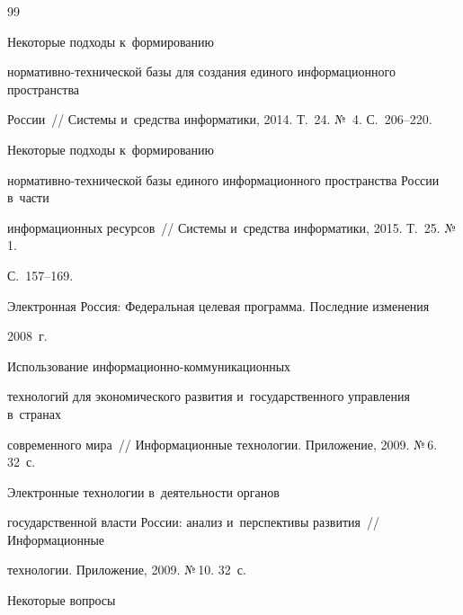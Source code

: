 {\small\frenchspacing

{%






\begin{thebibliography}{99}



\vspace*{-2pt}




       Некоторые подходы к~формированию 

нормативно-тех\-ни\-че\-ской базы для создания единого информационного пространства 

России~/\!\!/ Системы и~средства информатики, 2014. Т.~24. №\, 4. С.~206--220.


       Некоторые подходы к~формированию 

нормативно-тех\-ни\-че\-ской базы единого информационного пространства России в~части 

информационных ресурсов~/\!\!/ Системы и~средства информатики, 2015. Т.~25. №\,1. 

С.~157--169.


      Электронная Россия: Федеральная целевая программа. Последние изменения 

2008~г.


       Использование информационно-коммуникационных 

технологий для экономического развития и~государственного управления в~странах 

современного мира~/\!\!/ Информационные технологии. Приложение, 2009. №\,6. 32~с.


       Электронные технологии в~деятельности органов 

государственной власти России: анализ и~перспективы развития~/\!\!/ Информационные 

технологии. Приложение, 2009. №\,10. 32~с.


       Некоторые вопросы 


\end{thebibliography}}}
